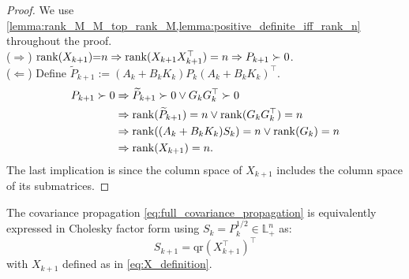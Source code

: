 \begin{proof}
	We use \cref{lemma:rank_M_M_top_rank_M,lemma:positive_definite_iff_rank_n} throughout the proof. \\
	($\Rightarrow$) 
	$\rank(X_{k+1}) {=} n \Rightarrow \rank(X_{k+1} X_{k+1}^\top) = n \Rightarrow P_{k+1} \succ 0$.\\
	($\Leftarrow$)
	Define $\widetilde{P}_{k+1} := (A_k + B_k K_k) P_k (A_k + B_k K_k)^\top$.
	\begin{align*}
	P_{k+1} \succ 0 &\Rightarrow \widetilde{P}_{k+1} \succ 0 \lor G_k G_k^\top \succ 0 \\
	&\Rightarrow \rank(\widetilde{P}_{k+1}) = n \lor \rank(G_k G_k^\top) = n \\
	&\Rightarrow \rank((A_k + B_k K_k) S_k) = n \lor \rank(G_k) = n \\
	&\Rightarrow \rank(X_{k+1}) = n.
	\end{align*}
	The last implication is since the column space of $X_{k+1}$ includes the column space of its submatrices.
\end{proof}

\begin{lemma}
	\label{lemma:sqrt_propagation}
	The covariance propagation \cref{eq:full_covariance_propagation} is equivalently expressed in Cholesky factor form using $S_k = P_k^{1/2} \in \mathbb{L}_+^n$ as:
	\begin{equation} \label{eq:square_root_covariance_propagation_nonlinear_feedback_control}
		S_{k+1} = \mathrm{qr}(X_{k+1}^\top)^\top
	\end{equation}
	with $X_{k+1}$ defined as in \cref{eq:X_definition}.
\end{lemma}

